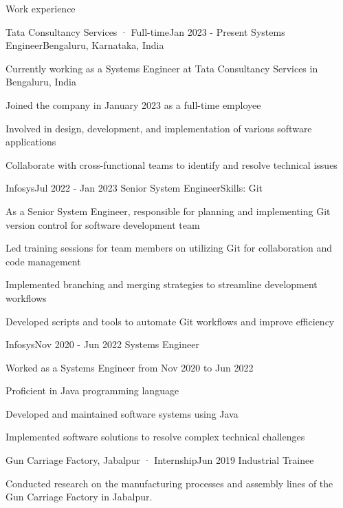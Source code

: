 \documentclass{resume} %
\begin{document}
\begin{rSection}{Work experience}
\begin{rSubsection}{Tata Consultancy Services · Full-time}{Jan 2023 - Present }{Systems Engineer}{Bengaluru, Karnataka, India }
                \item Currently working as a Systems Engineer at Tata Consultancy Services in Bengaluru, India
                \item Joined the company in January 2023 as a full-time employee
                \item Involved in design, development, and implementation of various software applications
                \item Collaborate with cross-functional teams to identify and resolve technical issues
\end{rSubsection}
\begin{rSubsection}{Infosys}{Jul 2022 - Jan 2023 }{Senior System Engineer}{Skills: Git }
                    \item As a Senior System Engineer, responsible for planning and implementing Git version control for software development team
                    \item Led training sessions for team members on utilizing Git for collaboration and code management
                    \item Implemented branching and merging strategies to streamline development workflows
                    \item Developed scripts and tools to automate Git workflows and improve efficiency
\end{rSubsection}
\begin{rSubsection}{Infosys}{Nov 2020 - Jun 2022 }{Systems Engineer}{}
                    \item Worked as a Systems Engineer from Nov 2020 to Jun 2022
                    \item Proficient in Java programming language
                    \item Developed and maintained software systems using Java
                    \item Implemented software solutions to resolve complex technical challenges
\end{rSubsection}
\begin{rSubsection}{Gun Carriage Factory, Jabalpur · Internship}{Jun 2019 }{Industrial Trainee}{}
                \item Conducted research on the manufacturing processes and assembly lines of the Gun Carriage Factory in Jabalpur.

\end{rSubsection}
\end{rSection}
\end{document}
